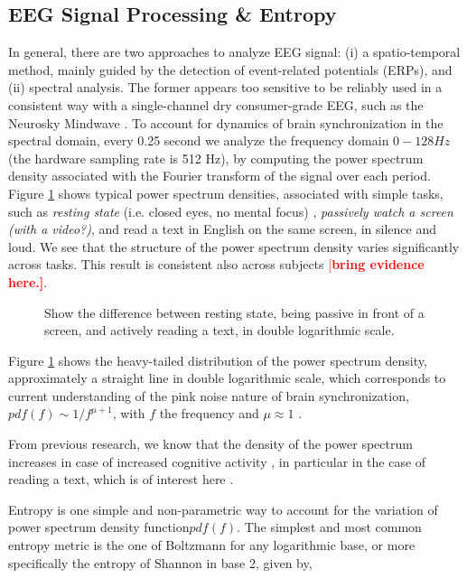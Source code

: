 \subsection{EEG Signal Processing \& Entropy}
In general, there are two approaches to analyze EEG signal:  (i) a spatio-temporal method, mainly guided by the detection of event-related potentials (ERPs), and (ii) spectral analysis. The former appears too sensitive to be reliably used in a consistent way with a single-channel dry consumer-grade EEG, such as the Neurosky Mindwave \cite{}. To account for dynamics of brain synchronization in the spectral domain, every 0.25 second we analyze the frequency domain $0-128Hz$ (the hardware sampling rate is 512 Hz), by computing the power spectrum density associated with the Fourier transform of the signal over each period. Figure \ref{fig:pspectrum} shows typical power spectrum densities, associated with simple tasks, such as {\it resting state} (i.e. closed eyes, no mental focus) \cite{}, {\it passively watch a screen (with a video?)}, and read a text in English on the same screen, in silence and loud. We see that the structure of the power spectrum density varies significantly across tasks. This result is consistent also across subjects \textcolor{red}{[\bf bring evidence here.]}.

 \begin{figure}[!t]
\centering
\caption{Show the difference between resting state, being passive in front of a screen, and actively reading a text, in double logarithmic scale.}
\label{fig:pspectrum}
\end{figure}

Figure \ref{fig:pspectrum} shows the heavy-tailed distribution of the power spectrum density, approximately a straight line in double logarithmic scale, which corresponds to current understanding of the pink noise nature of brain synchronization, $pdf(f) \sim 1/f^{\mu+1}$, with $f$ the frequency and $\mu \approx 1$ \cite{pink noise brain}.

From previous research, we know that the density of the power spectrum increases in case of increased cognitive activity \cite{}, in particular in the case of reading a text, which is of interest here \cite{}. 

Entropy is one simple and non-parametric way to account for the variation of power spectrum density function$pdf(f)$. The simplest and most common entropy metric is the one of Boltzmann for any logarithmic base, or more specifically the entropy of Shannon in base 2, given by,

